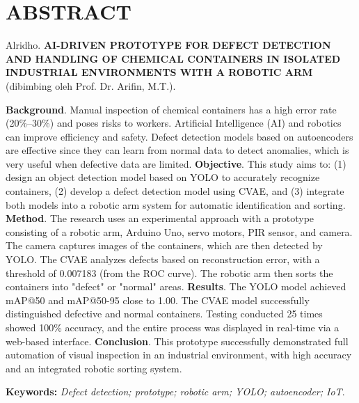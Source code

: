 \begingroup
\singlespacing
\chapter*{ABSTRACT}

\noindent
Alridho. \textbf{ AI-DRIVEN PROTOTYPE FOR DEFECT DETECTION AND HANDLING OF CHEMICAL CONTAINERS IN ISOLATED INDUSTRIAL ENVIRONMENTS WITH A ROBOTIC ARM} (dibimbing oleh Prof. Dr. Arifin, M.T.). \par

\vspace*{0.1cm}
 
\noindent
\textbf{Background}. Manual inspection of chemical containers has a high error rate (20\%–30\%) and poses risks to workers. Artificial Intelligence (AI) and robotics can improve efficiency and safety. Defect detection models based on autoencoders are effective since they can learn from normal data to detect anomalies, which is very useful when defective data are limited. \textbf{Objective}. This study aims to: (1) design an object detection model based on YOLO to accurately recognize containers, (2) develop a defect detection model using CVAE, and (3) integrate both models into a robotic arm system for automatic identification and sorting. \textbf{Method}. The research uses an experimental approach with a prototype consisting of a robotic arm, Arduino Uno, servo motors, PIR sensor, and camera. The camera captures images of the containers, which are then detected by YOLO. The CVAE analyzes defects based on reconstruction error, with a threshold of 0.007183 (from the ROC curve). The robotic arm then sorts the containers into "defect" or "normal" areas. \textbf{Results}. The YOLO model achieved mAP@50 and mAP@50-95 close to 1.00. The CVAE model successfully distinguished defective and normal containers. Testing conducted 25 times showed 100\% accuracy, and the entire process was displayed in real-time via a web-based interface. \textbf{Conclusion}. This prototype successfully demonstrated full automation of visual inspection in an industrial environment, with high accuracy and an integrated robotic sorting system.


\vspace*{0.1cm}

\noindent
\textbf{Keywords:} \textit{Defect detection; prototype; robotic arm; YOLO; autoencoder; IoT}.

\endgroup
